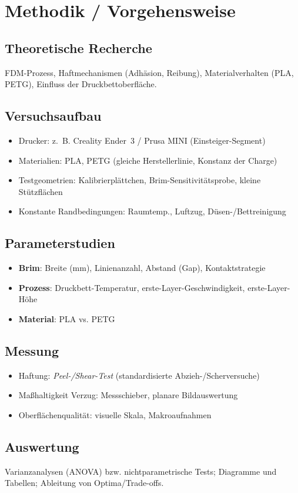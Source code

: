 \chapter{Methodik / Vorgehensweise}
\label{cha:Methodik / Vorgehensweise}

\section{Theoretische Recherche}
FDM-Prozess, Haftmechanismen (Adhäsion, Reibung), Materialverhalten (PLA, PETG), Einfluss der Druckbettoberfläche.


\section{Versuchsaufbau}
\begin{itemize}
\item Drucker: z.~B. Creality Ender~3 / Prusa MINI (Einsteiger-Segment)
\item Materialien: PLA, PETG (gleiche Herstellerlinie, Konstanz der Charge)
\item Testgeometrien: Kalibrierplättchen, Brim-Sensitivitätsprobe, kleine Stützflächen
\item Konstante Randbedingungen: Raumtemp., Luftzug, Düsen-/Bettreinigung
\end{itemize}


\section{Parameterstudien}
\begin{itemize}
\item \textbf{Brim}: Breite (mm), Linienanzahl, Abstand (Gap), Kontaktstrategie
\item \textbf{Prozess}: Druckbett-Temperatur, erste-Layer-Geschwindigkeit, erste-Layer-Höhe
\item \textbf{Material}: PLA vs. PETG
\end{itemize}


\section{Messung}
\begin{itemize}
\item Haftung: \emph{Peel-/Shear-Test} (standardisierte Abzieh-/Scherversuche)
\item Maßhaltigkeit \/ Verzug: Messschieber, planare Bildauswertung
\item Oberflächenqualität: visuelle Skala, Makroaufnahmen
\end{itemize}


\section{Auswertung}
Varianzanalysen (ANOVA) bzw. nichtparametrische Tests; Diagramme und Tabellen; Ableitung von Optima/Trade-offs.